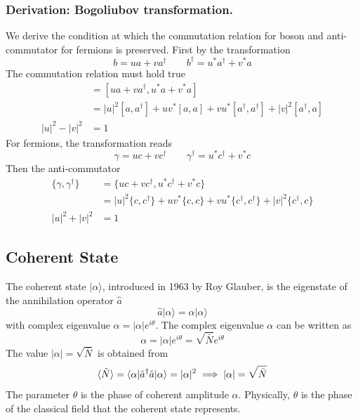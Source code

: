 \documentclass[../../../main.tex]{subfiles}
\begin{document}
\subsubsection{Derivation: Bogoliubov transformation.}
We derive the condition at which the commutation relation for boson and anti-commutator for fermions is preserved.
First by the transformation 
\begin{equation*}
b = ua + va^\dagger\qquad
b^\dagger = u^* a^\dagger + v^* a
\end{equation*}
The commutation relation must hold true
\begin{align*}
[b, b^\dagger] 
& =  [ua + va^\dagger, u^* a + v^* a]\\
& =  |u|^2[a, a^\dagger] + uv^*[a, a] + vu^*[a^\dagger, a^\dagger] + |v|^2[a^\dagger, a]\\
|u|^2-|v|^2 & =  1
\end{align*}
For fermions, the transformation reads 
\begin{equation*}
\gamma = u c + v c^\dagger\qquad
\gamma^\dagger = u^* c^\dagger + v^* c
\end{equation*}
Then the anti-commutator
\begin{align*}
\{ \gamma, \gamma^\dagger \} 
& =  \{ u c + v c^\dagger, u^* c^\dagger + v^* c \}\\
& =  |u|^2 \{ c, c^\dagger \} + uv^* \{ c, c \} + v u^* \{ c^\dagger, c^\dagger \} + |v|^2 \{ c^\dagger, c \} \\
  |u|^2 + |v|^2 & = 1
\end{align*}



\subsection{Coherent State}
The coherent state $|\alpha\rangle$, introduced in 1963 by Roy Glauber, is the eigenstate of the annihilation operator $\hat{a}$
\begin{equation*}
  \hat{a}|\alpha\rangle = \alpha|\alpha\rangle
\end{equation*}
with complex eigenvalue $\alpha = |\alpha|e^{i\theta}$.
The complex eigenvalue $\alpha$ can be written as
\begin{equation*}
  \alpha = |\alpha| e^{i\theta}=\sqrt{\bar{N} }e^{i\theta}
\end{equation*}
The value $|\alpha|=\sqrt{\bar{N}}$ is obtained from
\begin{equation*}
  \braket{\hat{N}  } =\braket{\alpha  | \hat{a}^\dagger \hat{a}|\alpha }=|\alpha|^2\implies |\alpha|=\sqrt{\bar{N}}
\end{equation*}
The parameter $\theta$ is the phase of coherent amplitude $\alpha$.
Physically, $\theta$ is the phase of the classical field that the coherent state represents.
\end{document}
